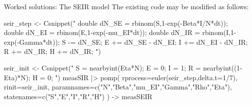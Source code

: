 \documentclass[
  ignorenonframetext,
  aspectratio=169,
  t]{beamer}
\newenvironment{Shaded}{\begin{snugshade}}{\end{snugshade}}
\newcommand{\AttributeTok}[1]{\textcolor[rgb]{0.40,0.45,0.13}{#1}}
\newcommand{\DecValTok}[1]{\textcolor[rgb]{0.68,0.00,0.00}{#1}}
\newcommand{\FunctionTok}[1]{\textcolor[rgb]{0.28,0.35,0.67}{#1}}
\newcommand{\NormalTok}[1]{\textcolor[rgb]{0.00,0.23,0.31}{#1}}
\newcommand{\OtherTok}[1]{\textcolor[rgb]{0.00,0.23,0.31}{#1}}
\newcommand{\SpecialCharTok}[1]{\textcolor[rgb]{0.37,0.37,0.37}{#1}}
\newcommand{\StringTok}[1]{\textcolor[rgb]{0.13,0.47,0.30}{#1}}
\theoremstyle{definition}
\begin{document}
\begin{frame}{Worked solutions: The SEIR
model}
\label{worked-solutions-the-seir-model}
The existing code may be modified as follows:

\begin{Shaded}
\begin{Highlighting}[]
\NormalTok{seir\_step }\OtherTok{\textless{}{-}} \FunctionTok{Csnippet}\NormalTok{(}\StringTok{"}
\StringTok{  double dN\_SE = rbinom(S,1{-}exp({-}Beta*I/N*dt));}
\StringTok{  double dN\_EI = rbinom(E,1{-}exp({-}mu\_EI*dt));}
\StringTok{  double dN\_IR = rbinom(I,1{-}exp({-}Gamma*dt));}
\StringTok{  S {-}= dN\_SE;}
\StringTok{  E += dN\_SE {-} dN\_EI;}
\StringTok{  I += dN\_EI {-} dN\_IR;}
\StringTok{  R += dN\_IR;}
\StringTok{  H += dN\_IR;}
\StringTok{"}\NormalTok{)}
\end{Highlighting}
\end{Shaded}

\begin{Shaded}
\begin{Highlighting}[]
\NormalTok{seir\_init }\OtherTok{\textless{}{-}} \FunctionTok{Csnippet}\NormalTok{(}\StringTok{"}
\StringTok{  S = nearbyint(Eta*N);}
\StringTok{  E = 0;}
\StringTok{  I = 1;}
\StringTok{  R = nearbyint((1{-}Eta)*N);}
\StringTok{  H = 0;}
\StringTok{"}\NormalTok{)}
\NormalTok{measSIR }\SpecialCharTok{|\textgreater{}}
  \FunctionTok{pomp}\NormalTok{(}
    \AttributeTok{rprocess=}\FunctionTok{euler}\NormalTok{(seir\_step,}\AttributeTok{delta.t=}\DecValTok{1}\SpecialCharTok{/}\DecValTok{7}\NormalTok{),}
    \AttributeTok{rinit=}\NormalTok{seir\_init,}
    \AttributeTok{paramnames=}\FunctionTok{c}\NormalTok{(}\StringTok{"N"}\NormalTok{,}\StringTok{"Beta"}\NormalTok{,}\StringTok{"mu\_EI"}\NormalTok{,}\StringTok{"Gamma"}\NormalTok{,}\StringTok{"Rho"}\NormalTok{,}\StringTok{"Eta"}\NormalTok{),}
    \AttributeTok{statenames=}\FunctionTok{c}\NormalTok{(}\StringTok{"S"}\NormalTok{,}\StringTok{"E"}\NormalTok{,}\StringTok{"I"}\NormalTok{,}\StringTok{"R"}\NormalTok{,}\StringTok{"H"}\NormalTok{)}
\NormalTok{  ) }\OtherTok{{-}\textgreater{}}\NormalTok{ measSEIR}
\end{Highlighting}
\end{Shaded}
\end{frame}
\end{document}
